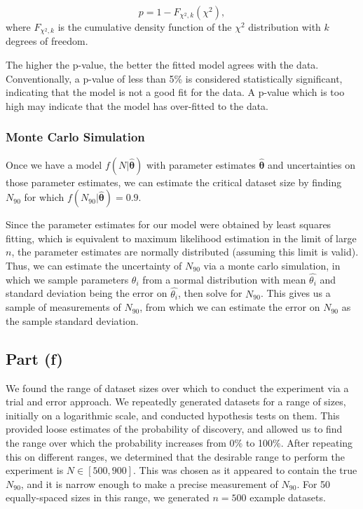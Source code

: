 \documentclass{article}
\begin{document}
\begin{equation}
p = 1 - F_{\chi^2, k}(\chi^2),
\label{pval_chi2}
\end{equation}
where $F_{\chi^2, k}$ is the cumulative density function of the $\chi^2$ distribution with $k$ degrees of freedom. 

The higher the p-value, the better the fitted model agrees with the data. Conventionally, a p-value of less than 5\% is considered statistically significant, indicating that the model is not a good fit for the data. A p-value which is too high may indicate that the model has over-fitted to the data.

\subsubsection*{Monte Carlo Simulation}

Once we have a model $f(N| \hat{\boldsymbol{\theta}})$ with parameter estimates $\hat{\boldsymbol{\theta}}$ and uncertainties on those parameter estimates, we can estimate the critical dataset size by finding $N_{90}$ for which $f(N_{90}| \hat{\boldsymbol{\theta}}) = 0.9$. 

Since the parameter estimates for our model were obtained by least squares fitting, which is equivalent to maximum likelihood estimation in the limit of large $n$, the parameter estimates are normally distributed (assuming this limit is valid). Thus, we can estimate the uncertainty of $N_{90}$ via a monte carlo simulation, in which we sample parameters $\theta_i$ from a normal distribution with mean $\hat{\theta_i}$ and standard deviation being the error on $\hat{\theta_i}$, then solve for $N_{90}$. This gives us a sample of measurements of $N_{90}$, from which we can estimate the error on $N_{90}$ as the sample standard deviation.

\subsection*{Part (f)}

We found the range of dataset sizes over which to conduct the experiment via a trial and error approach. We repeatedly generated datasets for a range of sizes, initially on a logarithmic scale, and conducted hypothesis tests on them. This provided loose estimates of the probability of discovery, and allowed us to find the range over which the probability increases from 0\% to 100\%. After repeating this on different ranges, we determined that the desirable range to perform the experiment is $N \in [500, 900]$. This was chosen as it appeared to contain the true $N_{90}$, and it is narrow enough to make a precise measurement of $N_{90}$. For 50 equally-spaced sizes in this range, we generated $n = 500$ example datasets. 
\end{document}
